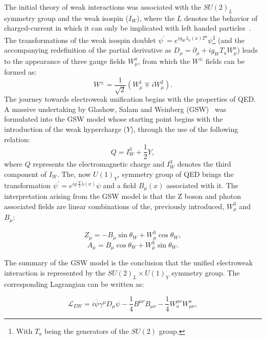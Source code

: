 \hspace{10pt} The initial theory of weak interactions was associated with the $SU(2)_L$ symmetry group and the weak isospin ($I_W$), where the $L$ denotes the behavior of charged-current in which it can only be implicated with left handed particles~\cite{thomson_2013, book:schwartz}. The transformations of the weak isospin doublet $\psi^{'} = e^{ig_W\lambda_a(x)T^a}\psi$\footnote{With $T_a$ being the generators of the $SU(2)$ group.} (and the accompanying redefinition of the partial derivative as $D_\mu = \partial_{\mu}+ig_WT_aW_\mu^a$) leads to the appearance of three gauge fields $W_\mu^a$, from which the $W^{\pm}$ fields can be formed as:
\begin{equation}
    W^{\pm} = \frac{1}{\sqrt{2}}(W_\mu^1\mp iW_\mu^2).
\end{equation}
\hspace{10pt} The journey towards electroweak unification begins with the properties of QED. A massive undertaking by Glashow, Salam and Weinberg (GSW)~\cite{glashow,salam,weinberg} was formulated into the GSW model whose starting point begins with the introduction of the weak hypercharge ($Y$), through the use of the following relation:
\begin{equation}
    Q = I_W^3+\frac{1}{2}Y,
\end{equation}
where $Q$ represents the electromagnetic charge and $I_W^{3}$ denotes the third component of $I_W$. The, now $U(1)_Y$, symmetry group of QED brings the transformation $\psi^{'} = e^{ig^{'}\frac{Y}{2}\lambda(x)}\psi$ and a field $B_{\mu}(x)$ associated with it. The interpretation arising from the GSW model is that the Z boson and photon associated fields are linear combinations of the, previously introduced, $W^{3}_{\mu}$ and $B_{\mu}$:

\begin{equation}
    Z_{\mu} = -B_{\mu}\sin\theta_W + W^3_{\mu}\cos\theta_W,
\end{equation}  
\begin{equation}
    A_{\mu} = B_{\mu}\cos\theta_W + W^3_{\mu}\sin\theta_W.
\end{equation}

The summary of the GSW model is the conclusion that the unified electroweak interaction is represented by the $SU(2)_L\times U(1)_Y$ symmetry group. The corresponding Lagrangian can be written as:

\begin{equation}
    \mathcal{L}_{EW} = i\overline{\psi}\gamma^{\mu}D_{\mu}\psi - \frac{1}{4}B^{\mu\nu}B_{\mu\nu} - \frac{1}{4}W^{\mu\nu}_aW^a_{\mu\nu},
    \label{eq:ew_unification}
\end{equation}

